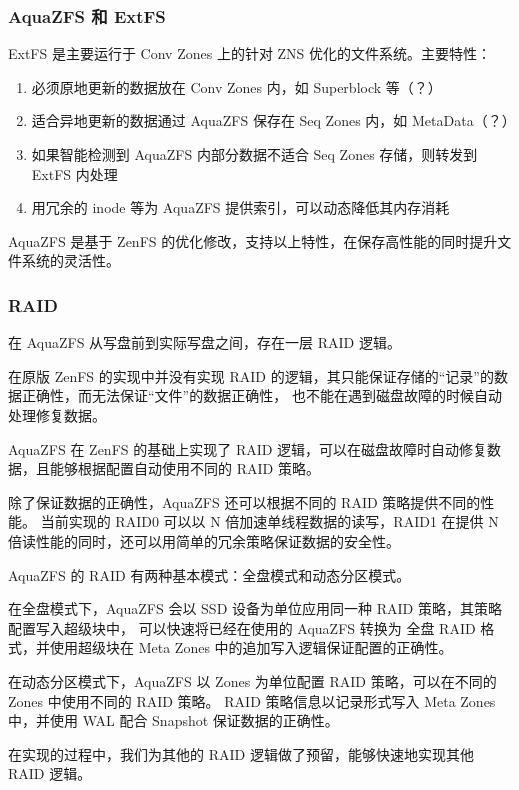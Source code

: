 \subsubsection*{AquaZFS 和 ExtFS}

ExtFS 是主要运行于 Conv Zones 上的针对 ZNS 优化的文件系统。主要特性：

\begin{enumerate}
    \item 必须原地更新的数据放在 Conv Zones 内，如 Superblock 等（？）
    \item 适合异地更新的数据通过 AquaZFS 保存在 Seq Zones 内，如 MetaData（？）
    \item 如果智能检测到 AquaZFS 内部分数据不适合 Seq Zones 存储，则转发到 ExtFS 内处理
    \item 用冗余的 inode 等为 AquaZFS 提供索引，可以动态降低其内存消耗
\end{enumerate}

AquaZFS 是基于 ZenFS 的优化修改，支持以上特性，在保存高性能的同时提升文件系统的灵活性。

\subsubsection*{RAID}

在 AquaZFS 从写盘前到实际写盘之间，存在一层 RAID 逻辑。

在原版 ZenFS 的实现中并没有实现 RAID 的逻辑，其只能保证存储的“记录”的数据正确性，而无法保证“文件”的数据正确性，
也不能在遇到磁盘故障的时候自动处理修复数据。

AquaZFS 在 ZenFS 的基础上实现了 RAID 逻辑，可以在磁盘故障时自动修复数据，且能够根据配置自动使用不同的 RAID 策略。

除了保证数据的正确性，AquaZFS 还可以根据不同的 RAID 策略提供不同的性能。
当前实现的 RAID0 可以以 N 倍加速单线程数据的读写，RAID1 在提供 N 倍读性能的同时，还可以用简单的冗余策略保证数据的安全性。

AquaZFS 的 RAID 有两种基本模式：全盘模式和动态分区模式。

在全盘模式下，AquaZFS 会以 SSD 设备为单位应用同一种 RAID 策略，其策略配置写入超级块中，
可以快速将已经在使用的 AquaZFS 转换为 全盘 RAID 格式，并使用超级块在 Meta Zones 中的追加写入逻辑保证配置的正确性。

在动态分区模式下，AquaZFS 以 Zones 为单位配置 RAID 策略，可以在不同的 Zones 中使用不同的 RAID 策略。
RAID 策略信息以记录形式写入 Meta Zones 中，并使用 WAL 配合 Snapshot 保证数据的正确性。

在实现的过程中，我们为其他的 RAID 逻辑做了预留，能够快速地实现其他 RAID 逻辑。

